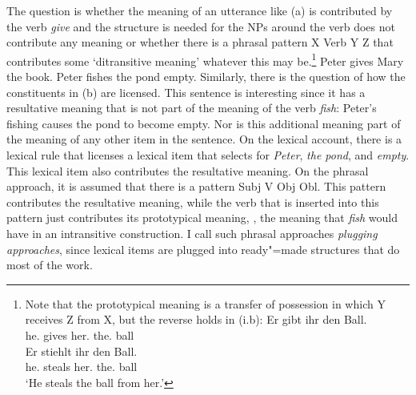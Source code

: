 The question is whether the meaning of an utterance like (a) is contributed by the verb
\emph{give} and the structure is needed for the NPs around the verb does not contribute any meaning
or whether there is a phrasal pattern X Verb Y Z that contributes some `ditransitive meaning'
whatever this may be.\footnote{
Note that the prototypical meaning is a transfer of possession in which Y receives Z from X, but the
reverse holds in (i.b):
\eal
\ex 
\gll Er gibt ihr den Ball.\\
     he.\nom{} gives her.\dat{} the.\acc{} ball\\
\ex
\gll Er stiehlt ihr den Ball.\\
     he.\nom{} steals  her.\dat{} the.\acc{} ball\\
\glt `He steals the ball from her.'
\zllast
}
\eal
\ex Peter gives Mary the book.
\ex Peter fishes the pond empty.
\zl
Similarly, there is the question of how the constituents in (b) are licensed. This sentence is
interesting since it has a resultative meaning that is not part of the meaning of the verb
\emph{fish}: Peter's fishing causes the pond to become empty. Nor is this additional meaning part of
the meaning of any other item in the sentence. On the lexical account,
there is a lexical rule that licenses a lexical item that selects for \emph{Peter}, \emph{the pond},
and \emph{empty}. This lexical item also contributes the resultative meaning. On the phrasal
approach, it is assumed that there is a pattern Subj V Obj Obl. This pattern contributes the
resultative meaning, while the verb that is inserted into this pattern just contributes its
prototypical meaning, \eg, the meaning that \emph{fish} would have in an
intransitive construction. I call such phrasal approaches \emph{plugging approaches}, since lexical
items are plugged into ready"=made structures that do most of the work.

